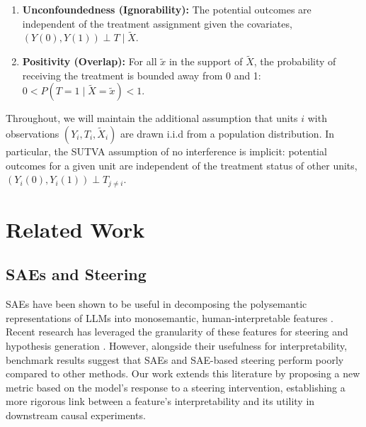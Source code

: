 \documentclass{article}
\theoremstyle{plain}
\theoremstyle{definition}
\theoremstyle{remark}
\begin{document}
\vspace{-10pt}
\begin{enumerate}
\itemsep2pt
    \item \textbf{Unconfoundedness (Ignorability):} The potential outcomes are independent of the treatment assignment given the covariates, $(Y(0), Y(1)) \perp T \mid \tilde{X}$.
    \item \textbf{Positivity (Overlap):} For all $\tilde{x}$ in the support of $\tilde{X}$, the probability of receiving the treatment is bounded away from 0 and 1: $0 < P(T=1 \mid \tilde{X} {=} \tilde{x}) < 1$.
\end{enumerate}
\vspace{-10pt}

Throughout, we will maintain the additional assumption that units $i$ with observations $(Y_i, T_i, \tilde{X}_i)$ are drawn i.i.d from a population distribution. In particular, the SUTVA assumption of no interference is implicit: potential outcomes for a given unit are independent of the treatment status of other units, $(Y_i(0), Y_i(1)) \perp T_{j\neq i}$.

\section{Related Work}

\subsection{SAEs and Steering}

SAEs have been shown to be useful in decomposing the polysemantic representations of LLMs into monosemantic, human-interpretable features \cite{Bills2023Autointerp, bricken2023monosemanticity, cunningham2023sparseautoencodershighlyinterpretable, templeton2024scaling}. Recent research has leveraged the granularity of these features for steering and hypothesis generation \cite{movva2025sparseautoencodershypothesisgeneration, peng2025usesparseautoencodersdiscover, zheng2025model}. However, alongside their usefulness for interpretability, benchmark results \cite{wu2025axbenchsteeringllmssimple, huang2024ravel, kantamneni2025sparseautoencodersusefulcase} suggest that SAEs and SAE-based steering perform poorly compared to other methods. Our work extends this literature by proposing a new metric based on the model's response to a steering intervention, establishing a more rigorous link between a feature's interpretability and its utility in downstream causal experiments.
\end{document}
